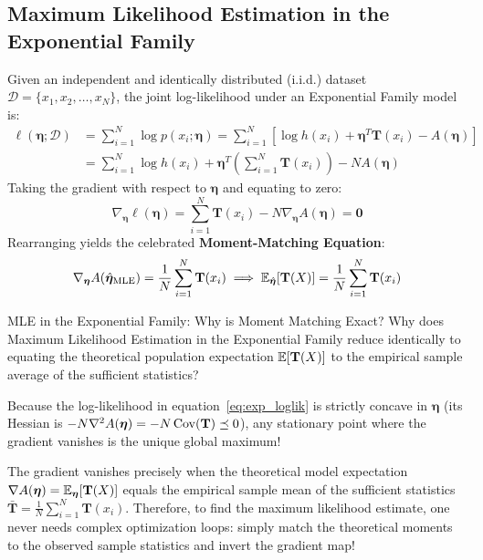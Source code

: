 \subsection{Maximum Likelihood Estimation in the Exponential Family}
Given an independent and identically distributed (i.i.d.) dataset $\mathcal{D} = \{x_1, x_2, \dots, x_N\}$, the joint log-likelihood under an Exponential Family model is:
\begin{align}
\ell(\boldsymbol{\eta}; \mathcal{D}) &= \sum_{i=1}^N \log p(x_i; \boldsymbol{\eta}) = \sum_{i=1}^N \left[ \log h(x_i) + \boldsymbol{\eta}^T \mathbf{T}(x_i) - A(\boldsymbol{\eta}) \right] \nonumber \\
&= \sum_{i=1}^N \log h(x_i) + \boldsymbol{\eta}^T \left( \sum_{i=1}^N \mathbf{T}(x_i) \right) - N A(\boldsymbol{\eta})
\label{eq:exp_loglik}
\end{align}
Taking the gradient with respect to $\boldsymbol{\eta}$ and equating to zero:
\begin{equation}
\nabla_{\boldsymbol{\eta}} \ell(\boldsymbol{\eta}) = \sum_{i=1}^N \mathbf{T}(x_i) - N \nabla_{\boldsymbol{\eta}} A(\boldsymbol{\eta}) = \mathbf{0}
\end{equation}
Rearranging yields the celebrated \textbf{Moment-Matching Equation}:
\begin{equation}
\nabla_{\boldsymbol{\eta}} A(\hat{\boldsymbol{\eta}}_{\text{MLE}}) = \frac{1}{N} \sum_{i=1}^N \mathbf{T}(x_i) \implies \operatorname{\mathbb{E}}_{\hat{\boldsymbol{\eta}}}[\mathbf{T}(X)] = \frac{1}{N} \sum_{i=1}^N \mathbf{T}(x_i)
\label{eq:mle_moment_matching}
\end{equation}

\begin{ponderbox}{MLE in the Exponential Family: Why is Moment Matching Exact?}
Why does Maximum Likelihood Estimation in the Exponential Family reduce identically to equating the theoretical population expectation $\operatorname{\mathbb{E}}[\mathbf{T}(X)]$ to the empirical sample average of the sufficient statistics?

\tcblower
Because the log-likelihood in equation~\eqref{eq:exp_loglik} is strictly concave in $\boldsymbol{\eta}$ (its Hessian is $-N \nabla^2 A(\boldsymbol{\eta}) = -N \operatorname{Cov}(\mathbf{T}) \preceq 0$), any stationary point where the gradient vanishes is the unique global maximum! 

The gradient vanishes precisely when the theoretical model expectation $\nabla A(\boldsymbol{\eta}) = \operatorname{\mathbb{E}}_{\boldsymbol{\eta}}[\mathbf{T}(X)]$ equals the empirical sample mean of the sufficient statistics $\bar{\mathbf{T}} = \frac{1}{N}\sum_{i=1}^N \mathbf{T}(x_i)$. Therefore, to find the maximum likelihood estimate, one never needs complex optimization loops: simply match the theoretical moments to the observed sample statistics and invert the gradient map!
\end{ponderbox}

